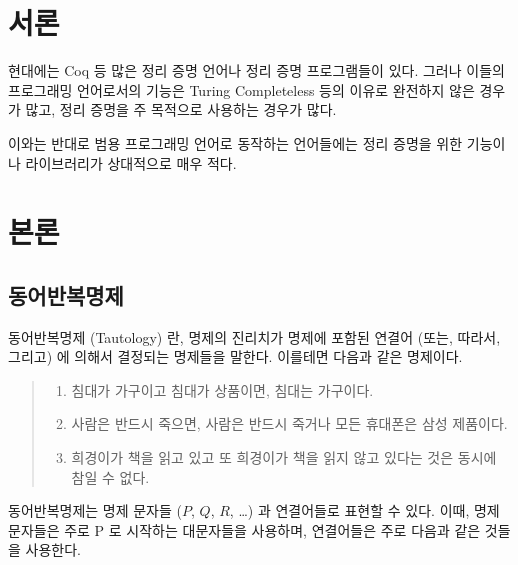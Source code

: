 \documentclass[a4paper, 12pt]{oblivoir}
\begin{document}
\section{서론}
현대에는 Coq 등 많은 정리 증명 언어나 정리 증명 프로그램들이 있다.
그러나 이들의 프로그래밍 언어로서의 기능은 Turing Completeless 등의 이유로 완전하지 않은 경우가 많고,
정리 증명을 주 목적으로 사용하는 경우가 많다.

이와는 반대로 범용 프로그래밍 언어로 동작하는 언어들에는 정리 증명을 위한 기능이나 라이브러리가 상대적으로 매우 적다.


\section{본론}
\subsection{동어반복명제}
동어반복명제 (Tautology) 란, 명제의 진리치가 명제에 포함된 연결어 (또는, 따라서, 그리고) 에 의해서 결정되는 명제들을 말한다.
이를테면 다음과 같은 명제이다.
\begin{quotation}
  \noindent\small
  \begin{enumerate}
  \item 침대가 가구이고 침대가 상품이면, 침대는 가구이다.
  \item 사람은 반드시 죽으면, 사람은 반드시 죽거나 모든 휴대폰은 삼성 제품이다.
  \item 희경이가 책을 읽고 있고 또 희경이가 책을 읽지 않고 있다는 것은 동시에 참일 수 없다.
  \end{enumerate}  
\end{quotation}

동어반복명제는 명제 문자들 ($P$, $Q$, $R$, \ldots{}) 과 연결어들로 표현할 수 있다.
이때, 명제 문자들은 주로 P 로 시작하는 대문자들을 사용하며,
연결어들은 주로 다음과 같은 것들을 사용한다.
\end{document}
